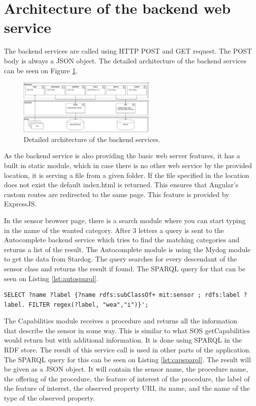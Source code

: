 \section{Architecture of the backend web service}

The backend services are called using HTTP POST and GET request. The POST body is always a JSON object. The detailed architecture of the backend services can be seen on Figure \ref{fig:backarch}.


\begin{figure}[h]
\centering
\includegraphics[width=0.6\textwidth]{figures/backendarch.png}
\caption{Detailed architecture of the backend services.\label{fig:backarch}}
\end{figure}

As the backend service is also providing the basic web server features, it has a built in static module, which in case there is no other web service by the provided location, it is serving a file from a given folder. If the file specified in the location does not exist the default index.html is returned. 
This ensures that Angular's custom routes are redirected to the same page. This feature is provided by ExpressJS.

In the sensor browser page, there is a search module where you can start typing in the name of the wanted category. After 3 letters a query is sent to the Autocomplete backend service which tries to find the matching categories and returns a list of the result. The Autocomplete module is using the Mydog module to get the data from Stardog. 
The query searches for every descendant of the sensor class and returns the result if found. The SPARQL query for that can be seen on Listing \ref{lst:autosparql}. 
\begin{lstlisting}[caption={SPARQL query for Autocomplete on the "wea" string\label{lst:autosparql}}]
SELECT ?name ?label {?name rdfs:subClassOf+ mit:sensor ; rdfs:label ?label. FILTER regex(?label, "wea","i")}';
\end{lstlisting}

The Capabilities module receives a procedure and returns all the information that describe the sensor in some way. This is similar to what SOS getCapabilities would return but with additional information. It is done using SPARQL in the RDF store. The result of this service call is used in other parts of the application. The SPARQL query for this can be seen on Listing \ref{lst:capsparql}. The result will be given as a JSON object. It will contain the sensor name, the procedure name, the offering of the procedure, the feature of interest of the procedure, the label of the feature of interest, the observed property URI, its name, and the name of the type of the observed property. 


